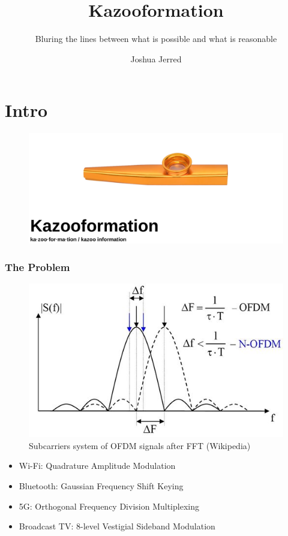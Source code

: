 \documentclass[
	11pt, %
]{beamer}
\title[Kazooformation]{Kazooformation} %
\subtitle{Bluring the lines between what is possible and what is reasonable} %
\author[Joshua Jerred]{Joshua Jerred} %
\institute[]{Utah Tech} %
\date[Utah Tech]{} %
\begin{document}
\section{Intro} %


\begin{frame}

  \begin{figure}
    \includegraphics[width=1\linewidth]{title_image.png}
  \end{figure}

\end{frame}

\begin{frame}
  \frametitle{The Problem}

  \begin{figure}
    \includegraphics[width=0.6\linewidth]{ofdm.png}
    \caption{Subcarriers system of OFDM signals after FFT (Wikipedia)}
  \end{figure}

  \begin{itemize}
    \item Wi-Fi: Quadrature Amplitude Modulation
    \item Bluetooth: Gaussian Frequency Shift Keying
    \item 5G: Orthogonal Frequency Division Multiplexing
    \item Broadcast TV: 8-level Vestigial Sideband Modulation
  \end{itemize}

\end{frame}
\end{document}

